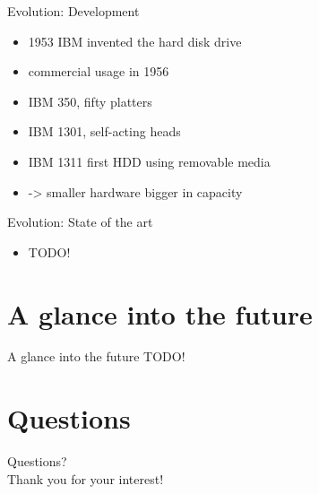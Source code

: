 \documentclass[12pt]{beamer}
\newlength{\wideitemsep}
\let\olditem\item
\renewcommand{\item}{\setlength{\itemsep}{\wideitemsep}\olditem}
\begin{document}
\begin{frame}[fragile]{Evolution: Development}
	\begin{itemize}
		\item 1953 IBM invented the hard disk drive
		\item commercial usage in 1956
		\item IBM 350, fifty platters
		\item IBM 1301, self-acting heads
		\item IBM 1311 first HDD using removable media
		\item -> smaller hardware bigger in capacity
	\end{itemize}
\end{frame}


\begin{frame}[fragile]{Evolution: State of the art}
	\begin{itemize}
		\item TODO!
	\end{itemize}
\end{frame}

\section{A glance into the future}
\begin{frame}[fragile]{A glance into the future}
	TODO!
\end{frame}

\section{Questions}
\begin{frame}[standout]
	Questions? \\
	Thank you for your interest!
\end{frame}
\end{document}
